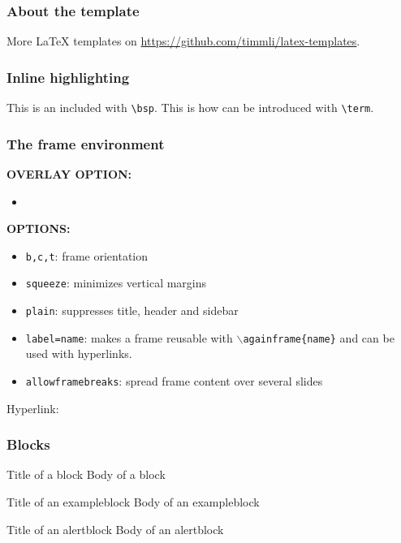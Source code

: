 \begin{frame}
  \frametitle{About the template}
  
More \LaTeX{} templates on \url{https://github.com/timmli/latex-templates}.
  
\end{frame}

\begin{frame}[fragile]
\frametitle{Inline highlighting}
This is an  included with \verb|\bsp|.
This is how  can be introduced with \verb|\term|.
\end{frame}

\begin{frame}[label=frameoptions]
\frametitle{The frame environment}


  \bigskip

  {\bf OVERLAY OPTION:}
  \begin{itemize}
  \item {\tt <+->} 
  \end{itemize}

  \bigskip

  {\bf OPTIONS:}
  \begin{itemize}
  \item {\tt b,c,t}: frame orientation
  \item {\tt squeeze}: minimizes vertical margins
  \item {\tt plain}: suppresses title, header and sidebar
  \item {\tt label=name}: makes a frame reusable with {\tt $\backslash$againframe\{name\}} and can be used with hyperlinks.
  \item {\tt allowframebreaks}: spread frame content over several slides 
  \end{itemize}

  \vfill 

  Hyperlink: \hyperlink{frameoptions}{}

\end{frame}
\begin{frame}
  \frametitle{Blocks}

  \begin{block}{Title of a block}		%
    Body of a block
  \end{block}

  \begin{exampleblock}{Title of an exampleblock}
    Body of an exampleblock
  \end{exampleblock}

  \begin{alertblock}{Title of an alertblock}
    Body of an alertblock
  \end{alertblock}
  
\end{frame}

